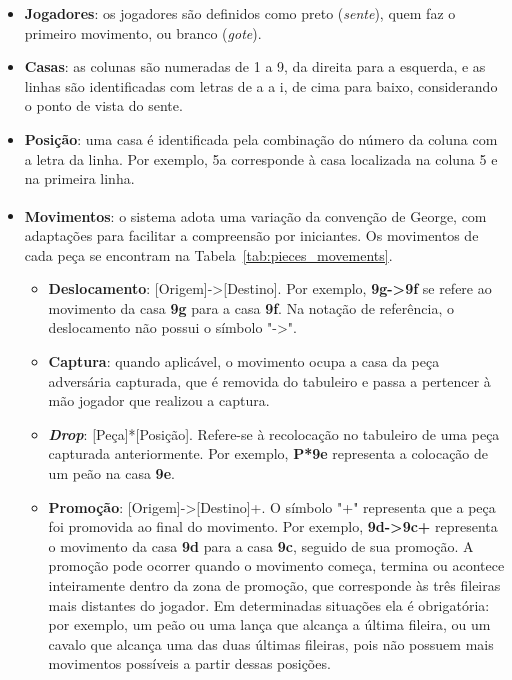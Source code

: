 \documentclass[a4paper, 11pt]{article}
\begin{document}
    \begin{itemize}
        \item \textbf{Jogadores}: os jogadores são definidos como preto (\textit{sente}), quem faz o primeiro movimento, ou branco (\textit{gote}).
        \item \textbf{Casas}: as colunas são numeradas de 1 a 9, da direita para a esquerda, e as linhas são identificadas com letras de a a i, de cima para baixo, considerando o ponto de vista do sente.
        \item \textbf{Posição}: uma casa é identificada pela combinação do número da coluna com a letra da linha. Por exemplo, 5a corresponde à casa localizada na coluna 5 e na primeira linha.
        \item \textbf{Movimentos}\textsuperscript{\cite{shogi-rules}}: o sistema adota uma variação da convenção de George, com adaptações para facilitar a compreensão por iniciantes. Os movimentos de cada peça se encontram na Tabela~\ref{tab:pieces_movements}.
            \begin{itemize}
                \item \textbf{Deslocamento}: [Origem]->[Destino]. Por exemplo, \textbf{9g->9f} se refere ao movimento da casa \textbf{9g} para a casa \textbf{9f}. Na notação de referência, o deslocamento não possui o símbolo "->".
                \item \textbf{Captura}: quando aplicável, o movimento ocupa a casa da peça adversária capturada, que é removida do tabuleiro e passa a pertencer à mão jogador que realizou a captura.
                \item \textit{\textbf{Drop}}: [Peça]*[Posição]. Refere-se à recolocação no tabuleiro de uma peça capturada anteriormente. Por exemplo, \textbf{P*9e} representa a colocação de um peão na casa \textbf{9e}.
                \item \textbf{Promoção}: [Origem]->[Destino]+. O símbolo "+" representa que a peça foi promovida ao final do movimento. Por exemplo, \textbf{9d->9c+} representa o movimento da casa \textbf{9d} para a casa \textbf{9c}, seguido de sua promoção. A promoção pode ocorrer quando o movimento começa, termina ou acontece inteiramente dentro da zona de promoção, que corresponde às três fileiras mais distantes do jogador. Em determinadas situações ela é obrigatória: por exemplo, um peão ou uma lança que alcança a última fileira, ou um cavalo que alcança uma das duas últimas fileiras, pois não possuem mais movimentos possíveis a partir dessas posições. 
            \end{itemize}
    \end{itemize}
\end{document}
